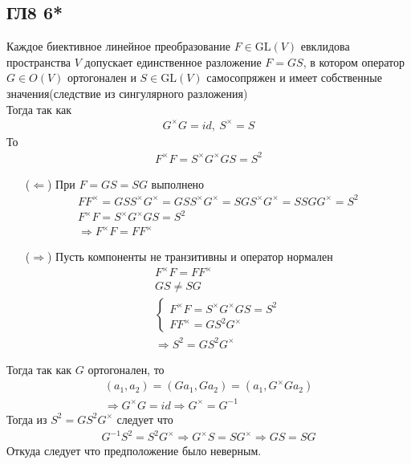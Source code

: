 \subsection*{ГЛ8 6*}
Каждое биективное линейное преобразование $F \in \text{GL}(V)$ евклидова пространства $V$ допускает единственное разложение $F = GS$, в котором оператор $G \in O(V)$ ортогонален и $S \in \text{GL}(V)$ самосопряжен и имеет собственные значения(следствие из сингулярного разложения)\\
Тогда так как
\begin{gather}
	G^{\times}G = id,\ S^{\times} = S
\end{gather} 
То
\begin{gather*}
	F^{\times}F = S^{\times}G^{\times}GS = S^2
\end{gather*}
\begin{enumerate}
\item[($\Leftarrow$)]
	При $F = GS = SG$ выполнено
	\begin{gather*}
		FF^{\times} = GSS^{\times}G^{\times} = GSS^{\times}G^{\times} = SGS^{\times}G^{\times} = SSGG^{\times} = S^2\\
		F^{\times}F = S^{\times}G^{\times}GS = S^2\\
		\Rightarrow F^{\times}F = FF^{\times}
	\end{gather*}
\item[($\Rightarrow$)]
	Пусть компоненты не транзитивны и оператор нормален
	\begin{gather*}
		F^{\times}F = FF^{\times}\\
		GS \ne SG\\
		\begin{cases}
			F^{\times}F = S^{\times}G^{\times}GS = S^2\\
			FF^{\times} = GS^2G^{\times}
		\end{cases}\\
		\Rightarrow S^2 = GS^2G^{\times}				
	\end{gather*}
\end{enumerate}
Тогда так как $G$ ортогонален, то 
\begin{gather*}
	(a_1,a_2) = (Ga_1, Ga_2) = (a_1, G^{\times}Ga_2)\\
	\Rightarrow G^{\times}G = id
	\Rightarrow G^{\times} = G^{-1}
\end{gather*}
Тогда из $S^2 = GS^2G^{\times}$ следует что
\begin{gather*}
	G^{-1}S^2 = S^2G^{\times} \Rightarrow G^{\times}S = SG^{\times} \Rightarrow GS = SG
\end{gather*}
Откуда следует что предположение было неверным.
		